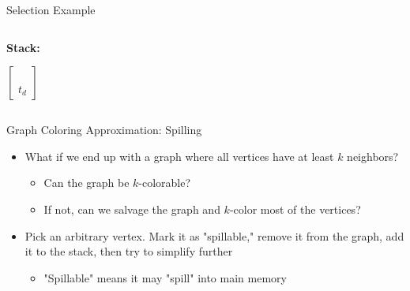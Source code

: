 \documentclass[aspectratio=169]{beamer}
\begin{document}
\begin{frame}{Selection Example}
    \begin{columns}
        \begin{column}{1cm}
            \textbf{Stack:}
            \vspace{0cm}
            
            $\begin{bmatrix}
                \\ \\ \\ t_d
            \end{bmatrix}$
        \end{column}
        \begin{column}{8cm}
        \end{column}
    \end{columns}
\end{frame}

\begin{frame}{Graph Coloring Approximation: Spilling}
    \begin{itemize}
        \item What if we end up with a graph where all vertices have at least $k$ neighbors?
        \begin{itemize}
            \item Can the graph be $k$-colorable?
            \item If not, can we salvage the graph and $k$-color most of the vertices?
        \end{itemize}
        \pause
        \item Pick an arbitrary vertex. Mark it as "spillable," remove it from the graph, add it to the stack, then try to simplify further
        \begin{itemize}
            \item "Spillable" means it may "spill" into main memory
        \end{itemize}
    \end{itemize}
\end{frame}
\end{document}

